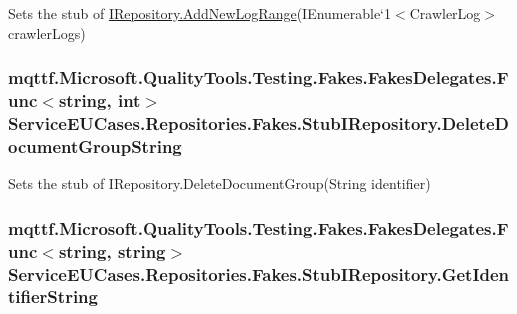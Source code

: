 Sets the stub of \hyperlink{interface_service_e_u_cases_1_1_repositories_1_1_i_repository_ae8af796db94815cb1e3639e73f0b8732}{I\-Repository.\-Add\-New\-Log\-Range}(I\-Enumerable`1$<$Crawler\-Log$>$ crawler\-Logs)

\hypertarget{class_service_e_u_cases_1_1_repositories_1_1_fakes_1_1_stub_i_repository_a6b857a5666453fd7c026cc80b366a93e}{
\subsubsection[{Delete\-Document\-Group\-String}]{\setlength{\rightskip}{0pt plus 5cm}mqttf.\-Microsoft.\-Quality\-Tools.\-Testing.\-Fakes.\-Fakes\-Delegates.\-Func$<$string, int$>$ Service\-E\-U\-Cases.\-Repositories.\-Fakes.\-Stub\-I\-Repository.\-Delete\-Document\-Group\-String}}\label{class_service_e_u_cases_1_1_repositories_1_1_fakes_1_1_stub_i_repository_a6b857a5666453fd7c026cc80b366a93e}


Sets the stub of I\-Repository.\-Delete\-Document\-Group(\-String identifier)

\hypertarget{class_service_e_u_cases_1_1_repositories_1_1_fakes_1_1_stub_i_repository_a608784a22fd60aee813b5f8b0637f54f}{
\subsubsection[{Get\-Identifier\-String}]{\setlength{\rightskip}{0pt plus 5cm}mqttf.\-Microsoft.\-Quality\-Tools.\-Testing.\-Fakes.\-Fakes\-Delegates.\-Func$<$string, string$>$ Service\-E\-U\-Cases.\-Repositories.\-Fakes.\-Stub\-I\-Repository.\-Get\-Identifier\-String}}\label{class_service_e_u_cases_1_1_repositories_1_1_fakes_1_1_stub_i_repository_a608784a22fd60aee813b5f8b0637f54f}



